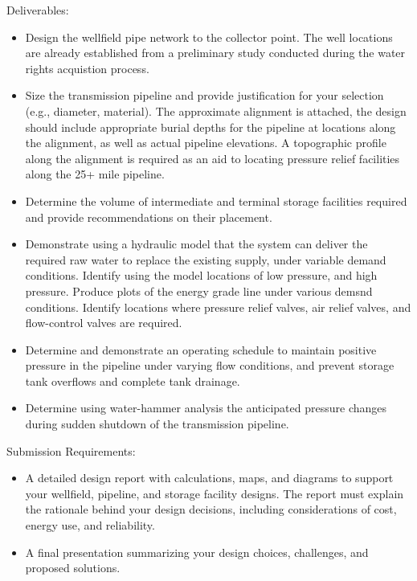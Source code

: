 \documentclass[12pt]{article}
\begin{document}
Deliverables:

\begin{itemize}
\item Design the wellfield pipe network to the collector point. The well locations are already established from a preliminary study conducted during the water rights acquistion process.
\item Size the transmission pipeline and provide justification for your selection (e.g., diameter, material).  The approximate alignment is attached, the design should include appropriate burial depths for the pipeline at locations along the alignment, as well as actual pipeline elevations.  A topographic profile along the alignment is required as an aid to locating pressure relief facilities along the 25+ mile pipeline.
\item Determine the volume of intermediate and terminal storage facilities required and provide recommendations on their placement.
\item Demonstrate using a hydraulic model that the system can deliver the required raw water to replace the existing supply, under variable demand conditions.  Identify using the model locations of low pressure, and high pressure. Produce plots of the energy grade line under various demsnd conditions.  Identify locations where pressure relief valves, air relief valves, and flow-control valves are required.
\item Determine and demonstrate an operating schedule to maintain positive pressure in the pipeline under varying flow conditions, and prevent storage tank overflows and complete tank drainage.
\item Determine using water-hammer analysis the anticipated pressure changes during sudden shutdown of the transmission pipeline.
\end{itemize}

Submission Requirements:
\begin{itemize}
\item A detailed design report with calculations, maps, and diagrams to support your wellfield, pipeline, and storage facility designs. The report must explain the rationale behind your design decisions, including considerations of cost, energy use, and reliability.
\item A final presentation summarizing your design choices, challenges, and proposed solutions.
\end{itemize}
\end{document}
